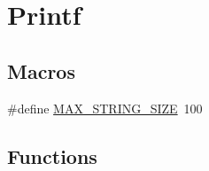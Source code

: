 \hypertarget{group__printf}{}\section{Printf}
\label{group__printf}
\subsection*{Macros}
\begin{DoxyCompactItemize}
\item 
\#define \hyperlink{group__printf_ga220f38b26fa99d4d91b574f42d991516}{M\+A\+X\+\_\+\+S\+T\+R\+I\+N\+G\+\_\+\+S\+I\+Z\+E}~100
\end{DoxyCompactItemize}
\subsection*{Functions}
